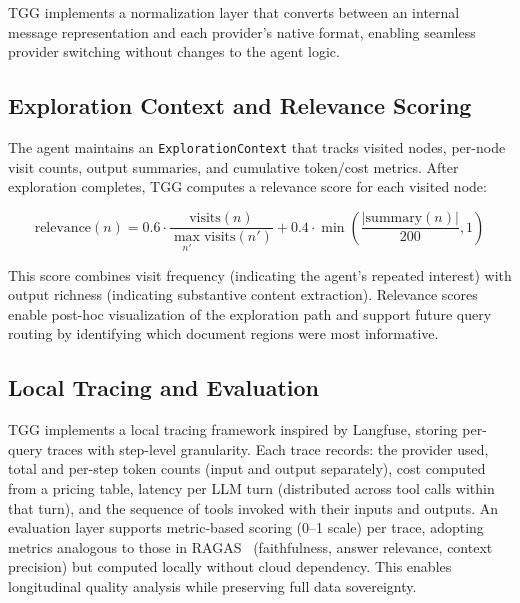 \documentclass[conference]{IEEEtran}
\begin{document}
TGG implements a normalization layer that converts between an internal message representation and each provider's native format, enabling seamless provider switching without changes to the agent logic.

\subsection{Exploration Context and Relevance Scoring}

The agent maintains an \texttt{ExplorationContext} that tracks visited nodes, per-node visit counts, output summaries, and cumulative token/cost metrics. After exploration completes, TGG computes a relevance score for each visited node:

\begin{equation}
\text{relevance}(n) = 0.6 \cdot \frac{\text{visits}(n)}{\max_{n'} \text{visits}(n')} + 0.4 \cdot \min\!\left(\frac{|\text{summary}(n)|}{200}, 1\right)
\label{eq:relevance}
\end{equation}

This score combines visit frequency (indicating the agent's repeated interest) with output richness (indicating substantive content extraction). Relevance scores enable post-hoc visualization of the exploration path and support future query routing by identifying which document regions were most informative.

\subsection{Local Tracing and Evaluation}

TGG implements a local tracing framework inspired by Langfuse, storing per-query traces with step-level granularity. Each trace records: the provider used, total and per-step token counts (input and output separately), cost computed from a pricing table, latency per LLM turn (distributed across tool calls within that turn), and the sequence of tools invoked with their inputs and outputs. An evaluation layer supports metric-based scoring (0--1 scale) per trace, adopting metrics analogous to those in RAGAS~\cite{es2024ragas} (faithfulness, answer relevance, context precision) but computed locally without cloud dependency. This enables longitudinal quality analysis while preserving full data sovereignty.

\end{document}
